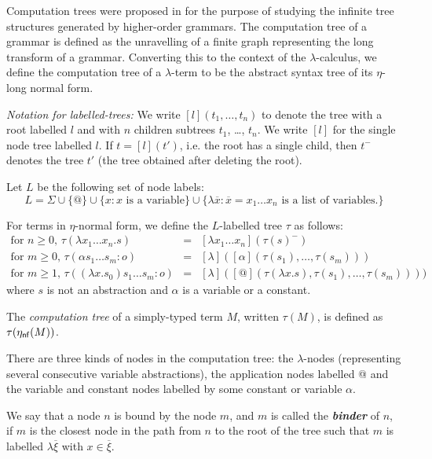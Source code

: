 \documentclass{llncs}
\newcommand\defname[1]{\textbf{\emph{#1}}}
\newcommand\etanf[1]{\eta_{\sf nf}(#1)}
\newcommand\union{\cup}
\begin{document}
Computation trees were proposed in \cite{OngHoMchecking2006} for the purpose of studying the infinite tree structures
generated by higher-order grammars. The computation tree of a grammar is defined as the unravelling of a finite graph representing the long transform of a grammar. Converting this to the context of the $\lambda$-calculus, we define the computation tree of a $\lambda$-term to be the abstract syntax tree of its $\eta$-long normal form.

\emph{Notation for labelled-trees:} We write $[l](t_1, \ldots, t_n)$ to denote the tree with a root labelled $l$ and with $n$ children subtrees $t_1$, \ldots, $t_n$. We write $[l]$ for the single node tree labelled $l$. If $t = [l](t')$, i.e. the root has a single child, then $t^-$ denotes the tree $t'$ (the tree obtained after deleting the root).

\begin{definition}
Let $L$ be the following set of node labels:
$$ L = \Sigma \union \{ @ \} \union \{ x : x \mbox { is a variable} \}
\union \{ \lambda \overline{x} : \overline{x} = x_1 \ldots x_n \mbox { is a list of variables.} \}
  $$

For terms in $\eta$-normal form, we define the $L$-labelled tree $\tau$ as follows:
\begin{eqnarray*}
  \mbox{for $n\geq0$, } \tau(\lambda x_1 \ldots x_n . s) &=& [\lambda x_1 \ldots x_n](\tau(s)^{-}) \\
  \mbox{for $m\geq0$, } \tau( \alpha s_1 \ldots s_m : o) &=& [ \lambda ]([\alpha](\tau(s_1),\ldots,\tau(s_m)))\\
  \mbox{for $m \geq 1$, } \tau((\lambda x.s_0) s_1 \ldots s_m :o) &=& [\lambda] ([@](\tau(\lambda x.s),\tau(s_1),\ldots,\tau(s_m))) )
\end{eqnarray*}
where $s$ is not an abstraction and $\alpha$ is a variable or a constant.

The \emph{computation tree} of a simply-typed term $M$, written $\tau(M)$, is defined as $\tau(\etanf{M})$.
\end{definition}

There are three kinds of nodes in the computation tree:
the $\lambda$-nodes (representing several consecutive variable abstractions),
the application nodes labelled @ and the variable and constant nodes labelled by some constant or variable $\alpha$.

We say that a node $n$ is bound by the node $m$, and $m$ is called the
\defname{binder} of $n$, if $m$ is the closest node in the path from $n$ to
the root of the tree such that $m$ is labelled $\lambda
\overline{\xi}$ with $x\in \overline{\xi}$.
\end{document}

